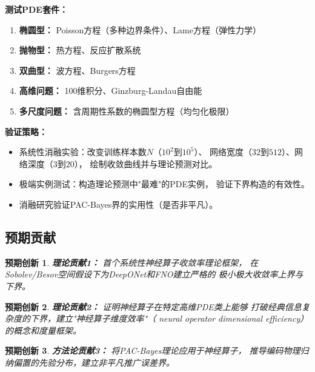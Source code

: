 \documentclass[12pt,a4paper,twoside]{article}
\newtheorem{innovation}{预期创新}[section]
\begin{document}
\textbf{测试PDE套件：}

\begin{enumerate}
    \item \textbf{椭圆型：} Poisson方程（多种边界条件）、Lame方程（弹性力学）
    \item \textbf{抛物型：} 热方程、反应扩散系统
    \item \textbf{双曲型：} 波方程、Burgers方程
    \item \textbf{高维问题：} 100维积分、Ginzburg-Landau自由能
    \item \textbf{多尺度问题：} 含周期性系数的椭圆型方程（均匀化极限）
\end{enumerate}

\textbf{验证策略：}
\begin{itemize}
    \item 系统性消融实验：改变训练样本数$N$（$10^2$到$10^5$）、
        网络宽度（$32$到$512$）、网络深度（$3$到$20$），
        绘制收敛曲线并与理论预测对比。
    \item 极端实例测试：构造理论预测中"最难"的PDE实例，
        验证下界构造的有效性。
    \item 消融研究验证PAC-Bayes界的实用性（是否非平凡）。
\end{itemize}

\subsection{预期贡献}

\begin{innovation}
\textbf{理论贡献1：} 首个系统性神经算子收敛率理论框架，
在Sobolev/Besov空间假设下为DeepONet和FNO建立严格的
极小极大收敛率上界与下界。
\end{innovation}

\begin{innovation}
\textbf{理论贡献2：} 证明神经算子在特定高维PDE类上能够
打破经典信息复杂度的下界，建立"神经算子维度效率"（
neural operator dimensional efficiency）的概念和度量框架。
\end{innovation}

\begin{innovation}
\textbf{方法论贡献3：} 将PAC-Bayes理论应用于神经算子，
推导编码物理归纳偏置的先验分布，建立非平凡推广误差界。
\end{innovation}
\end{document}
